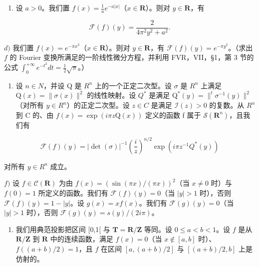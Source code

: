 \begin{enumerate}
\def\labelenumi{\alph{enumi})}
\setcounter{enumi}{2}
\tightlist
\item
    设 \(a > 0\)。我们置 \(f(x) = \frac{1}{a} e^{-a|x|}\)（\(x \in \mathbf{R}\)）。则对 \(y \in \mathbf{R}\)，有
\end{enumerate}

\[
\mathcal {F} (f) (y) = \frac {2}{4 \pi^ {2} y ^ {2} + a ^ {2}}.
\]

\(d)\) 我们置 \(f(x) = e^{-\pi x^2}\)（\(x \in \mathbf{R}\)）。则对 \(y \in \mathbf{R}\)，有 \(\mathcal{F}(f)(y) = e^{-\pi y^2}\)。（求出 \(f\) 的 Fourier 变换所满足的一阶线性微分方程，并利用 FVR，VII，§1，第 3 节的公式 \(\int_0^{+\infty} e^{-t^2} dt = \frac{1}{2} \sqrt{\pi}\)。）

\begin{enumerate}
\def\labelenumi{\alph{enumi})}
\setcounter{enumi}{4}
\tightlist
\item
    设 \(n \in N\)，并设 Q 是 \(R^{n}\) 上的一个正定二次型。设 \(\sigma\) 是 \(R^{n}\) 上满足 \(\mathrm{Q}(x) = \| \sigma(x) \|^{2}\) 的线性映射。设 \(Q^{*}\) 是满足 \(\mathrm{Q}^{*}(y) = \|^{t} \sigma^{-1}(y) \|^{2}\)（对所有 \(y \in R^{n}\)）的正定二次型。设 \(z \in C\) 是满足 \(\mathcal{I}(z) > 0\) 的复数。从 \(R^{n}\) 到 C 的、由 \(f(x) = \exp(i\pi z\mathrm{Q}(x))\) 定义的函数 f 属于 \(\mathcal{S}(\mathbf{R}^{n})\)，且我们有
\end{enumerate}

\[
\mathscr {F} (f) (y) = | \det (\sigma) | ^ {- 1} \left(\frac {i}{z}\right) ^ {n / 2} \exp (i \pi z ^ {- 1} Q ^ {*} (y))
\]

对所有 \(y \in R^{n}\) 成立。

\(f)\) 设 \(f \in \mathcal{C}(\mathbf{R})\) 为由 \(f(x) = (\sin(\pi x)/(\pi x))^2\)（当 \(x \neq 0\) 时）与 \(f(0) = 1\) 所定义的函数。我们有 \(\mathcal{F}(f)(y) = 0\)（当 \(|y| > 1\) 时），否则 \(\mathcal{F}(f)(y) = 1 - |y|\)。设 \(g(x) = xf(x)\)。我们有 \(\mathcal{F}(g)(y) = 0\)（当 \(|y| > 1\) 时），否则 \(\mathcal{F}(g)(y) = s(y)/(2i\pi)\)。

\begin{enumerate}
\def\labelenumi{\arabic{enumi})}
\setcounter{enumi}{1}
\tightlist
\item
  我们用典范投影把区间 {[}0,1{[} 与 \(\mathbf{T} = \mathbf{R} / \mathbf{Z}\) 等同。设 \(0 \leqslant a < b < 1\)。设 \(f\) 是从 \(\mathbf{R} / \mathbf{Z}\) 到 \(\mathbf{R}\) 中的连续函数，满足 \(f(x) = 0\)（当 \(x \notin [a,b]\) 时）、\(f((a + b) / 2) = 1\)，且 \(f\) 在区间 \([a, (a + b) / 2]\) 与 \([(a + b) / 2, b]\) 上是仿射的。
\end{enumerate}

